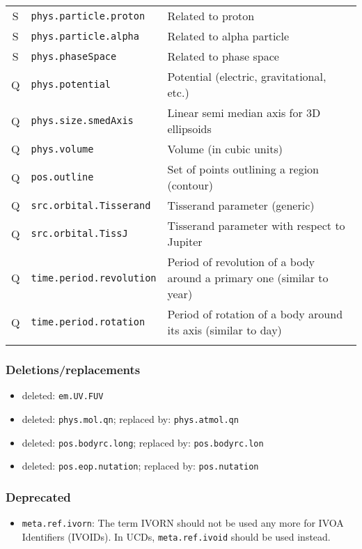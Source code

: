 \documentclass[11pt,a4paper]{ivoa}
\begin{document}
\begin{longtable}[h!]{c|p{39.5ex}|D{0.45\textwidth}}
S & {\tt phys.particle.proton} & Related to proton\\
S & {\tt phys.particle.alpha} & Related to alpha particle\\
S & {\tt phys.phaseSpace} & Related to phase space\\
Q & {\tt phys.potential} & Potential (electric, gravitational, etc.)\\
Q & {\tt phys.size.smedAxis} & Linear semi median axis for 3D ellipsoids\\
Q & {\tt phys.volume} & Volume (in cubic units)\\
Q & {\tt pos.outline} & Set of points outlining a region (contour)\\
Q & {\tt src.orbital.Tisserand} & Tisserand parameter (generic)\\
Q & {\tt src.orbital.TissJ} & Tisserand parameter with respect to Jupiter\\
Q & {\tt time.period.revolution} & Period of revolution of a body around a primary one (similar to year)\\
Q & {\tt time.period.rotation} & Period of rotation of a body around its axis (similar to day)\\
\sptablerule
\end{longtable}

\subsubsection*{Deletions/replacements}
\begin{itemize}
\item deleted: {\tt em.UV.FUV} 
\item deleted: {\tt phys.mol.qn}; replaced by: {\tt phys.atmol.qn}
\item deleted: {\tt pos.bodyrc.long}; replaced by: {\tt pos.bodyrc.lon}
\item deleted: {\tt pos.eop.nutation}; replaced by: {\tt pos.nutation}
\end{itemize}

\subsubsection*{Deprecated}
\begin{itemize}
\item {\tt meta.ref.ivorn}: The term IVORN should not be used any more for IVOA Identifiers (IVOIDs). 
In UCDs, {\tt meta.ref.ivoid} should be used instead.
\end{itemize} 
\end{document}
